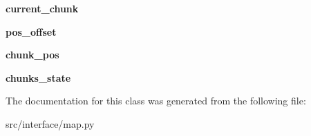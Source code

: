 \begin{DoxyCompactItemize}
\item 
\hypertarget{classinterface_1_1map_1_1_map_viewer_a309b8238a920b2c71ce390ac45c3542a}{{\bfseries current\-\_\-chunk}}\label{classinterface_1_1map_1_1_map_viewer_a309b8238a920b2c71ce390ac45c3542a}

\item 
\hypertarget{classinterface_1_1map_1_1_map_viewer_a711222341d6a732bcfb524178856dce2}{{\bfseries pos\-\_\-offset}}\label{classinterface_1_1map_1_1_map_viewer_a711222341d6a732bcfb524178856dce2}

\item 
\hypertarget{classinterface_1_1map_1_1_map_viewer_a11b73fbd23f3a67c1aa1e58efafd3adf}{{\bfseries chunk\-\_\-pos}}\label{classinterface_1_1map_1_1_map_viewer_a11b73fbd23f3a67c1aa1e58efafd3adf}

\item 
\hypertarget{classinterface_1_1map_1_1_map_viewer_af959880445d83740669c6a44c52d0f8e}{{\bfseries chunks\-\_\-state}}\label{classinterface_1_1map_1_1_map_viewer_af959880445d83740669c6a44c52d0f8e}

\end{DoxyCompactItemize}


\-The documentation for this class was generated from the following file\-:\begin{DoxyCompactItemize}
\item 
src/interface/map.\-py\end{DoxyCompactItemize}
